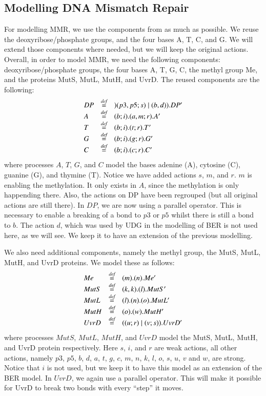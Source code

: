\subsection{Modelling DNA Mismatch Repair}

For modelling MMR, we use the components from \cite{10.1007/978-3-319-99498-7_8} as much as possible. We reuse the deoxyribose/phosphate groups, and the four bases A, T, C, and G. We will extend those components where needed, but we will keep the original actions. Overall, in order to model MMR, we need the following components: deoxyribose/phosphate groups, the four bases A, T, G, C, the methyl group Me, and the proteins MutS, MutL, MutH, and UvrD. The reused components are the following:
%
$$\begin{array}{lll}
DP & \stackrel{\emph{def}}{=} & )(p3,p5;s) \; \vert \; (b,d)).DP'\\
A & \stackrel{\emph{def}}{=} & (b;i).(a,m;r).A'\\
T & \stackrel{\emph{def}}{=} & (b;i).(t;r).T'\\
G & \stackrel{\emph{def}}{=} & (b;i).(g;r).G'\\
C & \stackrel{\emph{def}}{=} & (b;i).(c;r).C'\\
\end{array}$$
%
where processes $A$, $T$, $G$, and $C$ model the bases adenine (A), cytosine (C), guanine (G), and thymine (T). Notice we have added actions $s$, $m$, and $r$. $m$ is enabling the methylation. It only exists in $A$, since the methylation is only happending there. Also, the actions on DP have been regrouped (but all original actions are still there). In $DP$, we are now using a parallel operator. This is necessary to enable a breaking of a bond to $p3$ or $p5$ whilst there is still a bond to $b$. The action $d$, which was used by UDG in the modelling of BER is not used here, as we will see. We keep it to have an extension of the previous modelling.

We also need additional components, namely the methyl group, the MutS, MutL, MutH, and UvrD proteins. We model these as follows:
$$\begin{array}{lll}
Me & \stackrel{\emph{def}}{=} & (m).(n).Me'\\
MutS & \stackrel{\emph{def}}{=} & (k,k).(l).MutS'\\
MutL & \stackrel{\emph{def}}{=} & (l).(n).(o).MutL'\\
MutH & \stackrel{\emph{def}}{=} & (o).(w).MutH'\\
UvrD & \stackrel{\emph{def}}{=} & ((u;r) \; \vert \; (v;s)).UvrD'\\
\end{array}$$
%
where processes $MutS$, $MutL$, $MutH$, and $UvrD$ model the MutS, MutL, MutH, and UvrD protein respectively.  Here $s$, $i$, and $r$ are weak actions, all other actions, namely $p3$, $p5$, $b$, $d$, $a$, $t$, $g$, $c$, $m$, $n$, $k$, $l$, $o$, $s$, $u$, $v$ and $w$, are strong. Notice that $i$ is not used, but we keep it to have this model as an extension of the BER model. In $UvrD$, we again use a  parallel operator. This will make it possible for UvrD to break two bonds with every ``step'' it moves.



